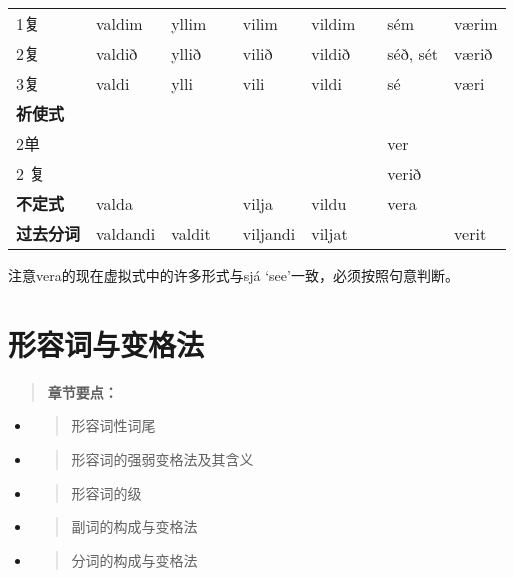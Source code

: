 \begin{longtable}{lllllllll}
  1复               & valdim   & yllim              &  & vilim      & vildim &  & sém      & værim      \\
  2复               & valdið   & yllið              &  & vilið      & vildið &  & séð, sét & værið      \\
  3复               & valdi    & ylli               &  & vili       & vildi  &  & sé       & væri       \\
  \textbf{祈使式}   &          &                    &  &            &        &  &          &            \\
  2单               &          &                    &  &            &        &  & ver      &            \\
  2 复              &          &                    &  &            &        &  & verið    &            \\
  \textbf{不定式}   & valda    &                    &  & vilja      & vildu  &  & vera     &            \\
  \textbf{过去分词} & valdandi & valdit             &  & viljandi   & viljat &  &          &
  verit                                                                                                 \\
\end{longtable}

注意vera的现在虚拟式中的许多形式与sjá `see‌'一致，必须按照句意判断。

\chapter{形容词与变格法}\label{形容词与变格法}

\begin{quote}
  \textbf{章节要点：}
\end{quote}

\begin{itemize}
  \item
        \begin{quote}
          形容词性词尾
        \end{quote}
  \item
        \begin{quote}
          形容词的强弱变格法及其含义
        \end{quote}
  \item
        \begin{quote}
          形容词的级
        \end{quote}
  \item
        \begin{quote}
          副词的构成与变格法
        \end{quote}
  \item
        \begin{quote}
          分词的构成与变格法
        \end{quote}
\end{itemize}

